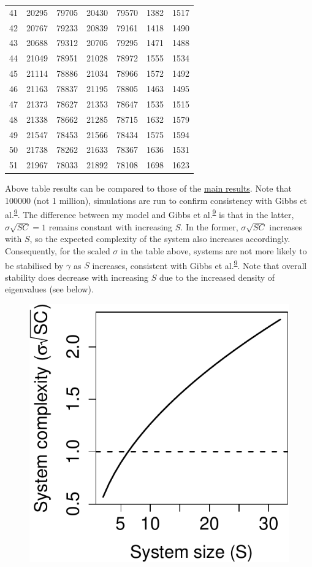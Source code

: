 \documentclass[]{article}
\begin{document}
\begin{longtable}[]{@{}rrrrrrr@{}}
41 & 20295 & 79705 & 20430 & 79570 & 1382 & 1517\tabularnewline
42 & 20767 & 79233 & 20839 & 79161 & 1418 & 1490\tabularnewline
43 & 20688 & 79312 & 20705 & 79295 & 1471 & 1488\tabularnewline
44 & 21049 & 78951 & 21028 & 78972 & 1555 & 1534\tabularnewline
45 & 21114 & 78886 & 21034 & 78966 & 1572 & 1492\tabularnewline
46 & 21163 & 78837 & 21195 & 78805 & 1463 & 1495\tabularnewline
47 & 21373 & 78627 & 21353 & 78647 & 1535 & 1515\tabularnewline
48 & 21338 & 78662 & 21285 & 78715 & 1632 & 1579\tabularnewline
49 & 21547 & 78453 & 21566 & 78434 & 1575 & 1594\tabularnewline
50 & 21738 & 78262 & 21633 & 78367 & 1636 & 1531\tabularnewline
51 & 21967 & 78033 & 21892 & 78108 & 1698 & 1623\tabularnewline
\bottomrule
\end{longtable}

Above table results can be compared to those of the
\protect\hyperlink{IncrS}{main results}. Note that 100000 (not 1
million), simulations are run to confirm consistency with Gibbs et
al.\textsuperscript{\protect\hyperlink{ref-Gibbs2017}{9}}. The
difference between my model and Gibbs et
al.\textsuperscript{\protect\hyperlink{ref-Gibbs2017}{9}} is that in the
latter, \(\sigma\sqrt{SC} = 1\) remains constant with increasing \(S\).
In the former, \(\sigma\sqrt{SC}\) increases with \(S\), so the expected
complexity of the system also increases accordingly. Consequently, for
the scaled \(\sigma\) in the table above, systems are not more likely to
be stabilised by \(\gamma\) as \(S\) increases, consistent with Gibbs et
al.\textsuperscript{\protect\hyperlink{ref-Gibbs2017}{9}}. Note that
overall stability does decrease with increasing \(S\) due to the
increased density of eigenvalues (see below).

\begin{figure}[H]

{\centering \includegraphics{SI_files/figure-latex/unnamed-chunk-34-1} 

}

\end{figure}
\end{document}

